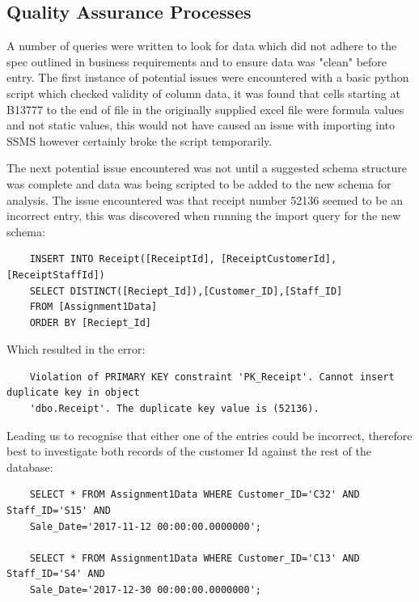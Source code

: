 \documentclass{article}
\newcounter{num}
\begin{document}
        \subsection{Quality Assurance Processes}
            A number of queries were written to look for data which did not adhere to the spec
            outlined in business requirements and to ensure data was "clean" before entry.
            The first instance of potential issues were encountered with a basic python script
            which checked validity of column data, it was found that cells starting at B13777
            to the end of file in the originally supplied excel file were formula values and 
            not static values, this would not have caused an issue with importing into SSMS 
            however certainly broke the script temporarily.
            \vspace{5mm}
            \par\noindent
            The next potential issue encountered was not until a suggested schema structure 
            was complete and data was being scripted to be added to the new schema for analysis.
            The issue encountered was that receipt number 52136 seemed to be an incorrect 
            entry, this was discovered when running the import query for the new schema:
            \begin{verbatim}
    INSERT INTO Receipt([ReceiptId], [ReceiptCustomerId],[ReceiptStaffId])
    SELECT DISTINCT([Reciept_Id]),[Customer_ID],[Staff_ID]
    FROM [Assignment1Data]
    ORDER BY [Reciept_Id]
            \end{verbatim}
            Which resulted in the error:
            \color{red}
            \begin{verbatim}
    Violation of PRIMARY KEY constraint 'PK_Receipt'. Cannot insert duplicate key in object 
    'dbo.Receipt'. The duplicate key value is (52136).
            \end{verbatim}
            \color{black}
            Leading us to recognise that either one of the entries could be incorrect, therefore
            best to investigate both records of the customer Id against the rest of the database:
            \begin{verbatim}
    SELECT * FROM Assignment1Data WHERE Customer_ID='C32' AND Staff_ID='S15' AND 
    Sale_Date='2017-11-12 00:00:00.0000000';

    SELECT * FROM Assignment1Data WHERE Customer_ID='C13' AND Staff_ID='S4' AND 
    Sale_Date='2017-12-30 00:00:00.0000000';
            \end{verbatim}
\end{document}
